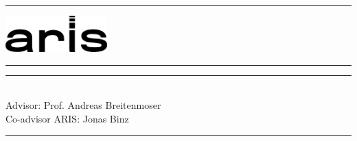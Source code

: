 
\hrule
\begin{minipage}{0.5\linewidth}
\end{minipage}
%
\begin{minipage}[c][][b]{0.49\linewidth}
\begin{flushright}
	\includegraphics[height=1.4cm]{images/aris-logo}
\end{flushright}
\end{minipage}
\hrule
\begin{center}
   	\begin{flushright}
   		\sffamily
   		{\Huge\sffamily\bfseries\subjectinfo\par}
   		\par\noindent\rule[-1ex]{\linewidth}{2pt}\par
		\vspace{0.5cm}
   		\emph{\huge\sffamily\titleinfo}
   		\vspace{1cm}\par
   		{\large\sffamily\authorinfo}\\
   		\vspace{1cm}
   		{\sffamily Advisor: Prof. Andreas Breitenmoser}\\
   		{\sffamily Co-advisor ARIS: Jonas Binz}\\
    \end{flushright}
   	\renewcommand\arraystretch{1.5}
   	\sffamily
\end{center}
\cfoot{}
\hrule
{
    \footnotesize 
    \begin{flushright}
        \dateinfo
    \end{flushright}
}

\restoregeometry